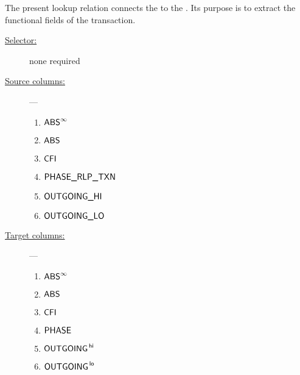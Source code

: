The present lookup relation connects the \txnDataMod{} to the \rlpTxnMod{}. Its purpose is to extract the functional fields of the transaction. 
\begin{description}
	\item[\underline{Selector:}] none required
	\item[\underline{Source columns:}] ---
		\begin{multicols}{3}
			\begin{enumerate}
				\item $\textsf{ABS}^\infty$
				\item $\textsf{ABS}$
				\item $\textsf{CFI}$
				\item $\textsf{PHASE\_RLP\_TXN}$
				\item $\textsf{OUTGOING}\textsf{\_HI}$
				\item $\textsf{OUTGOING}\textsf{\_LO}$
			\end{enumerate}
		\end{multicols}
	\item[\underline{Target columns:}] ---
		\begin{multicols}{3}
			\begin{enumerate}
				\item $\textsf{ABS}^\infty$
				\item $\textsf{ABS}$
				\item $\textsf{CFI}$
				\item $\textsf{PHASE}$
				\item $\textsf{OUTGOING}^{\mathsf{\,hi}}$
				\item $\textsf{OUTGOING}^{\mathsf{\,lo}}$
			\end{enumerate}
		\end{multicols}
\end{description}

